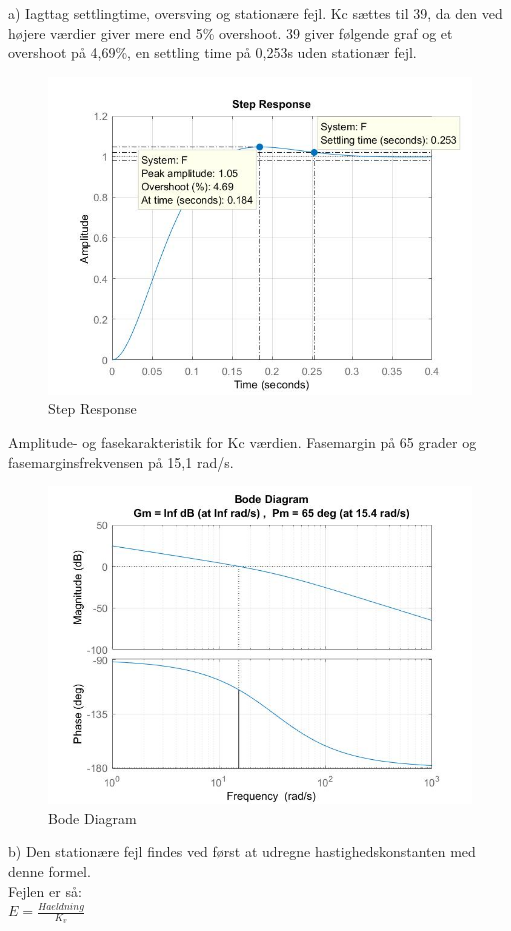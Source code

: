 \documentclass[]{report}
\begin{document}
\newline a) Iagttag settlingtime, oversving og stationære fejl. Kc sættes til 39, da den ved højere værdier giver mere end 5\% overshoot. 39 giver følgende graf og et overshoot på 4,69\%, en settling time på 0,253s uden stationær fejl.
\begin{figure} [h]
	\centering
	\includegraphics[width=0.68\linewidth]{graphics/a_steprespons}
	\caption{Step Response}
	\label{fig:asteprespons}
\end{figure}
\newline Amplitude- og fasekarakteristik for Kc værdien. Fasemargin på 65 grader og fasemarginsfrekvensen på 15,1 rad/s. \\
\begin{figure}[h]
	\centering
	\includegraphics[width=0.68\linewidth]{graphics/a_fasekarakteristik}
	\caption{Bode Diagram}
	\label{fig:afasekarakteristik}
\end{figure}
\newpage \noindent b) Den stationære fejl findes ved først at udregne hastighedskonstanten med denne formel.\\
Fejlen er så:\\
\newline $E = \frac{Haeldning}{K_{v}}$\\
\end{document}
